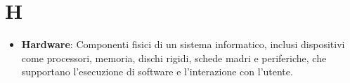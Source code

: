 \section{H}
\begin{itemize}
    \item \textbf{Hardware}: Componenti fisici di un sistema informatico, inclusi dispositivi come processori, memoria, dischi rigidi, schede madri e periferiche, che supportano l'esecuzione di software e l'interazione con l'utente.
\end{itemize}
